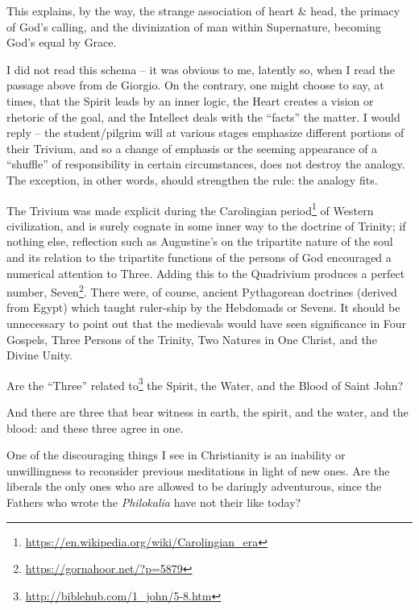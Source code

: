 This explains, by the way, the strange association of heart \& head, the primacy of God's calling, and the divinization of man within Supernature, becoming God's equal by Grace.

I did not read this schema -- it was obvious to me, latently so, when I read the passage above from de Giorgio. On the contrary, one might choose to say, at times, that the Spirit leads by an inner logic, the Heart creates a vision or rhetoric of the goal, and the Intellect deals with the ``facts'' the matter. I would reply -- the student/pilgrim will at various stages emphasize different portions of their Trivium, and so a change of emphasis or the seeming appearance of a ``shuffle'' of responsibility in certain circumstances, does not destroy the analogy. The exception, in other words, should strengthen the rule: the analogy fits.

The Trivium was made explicit during the Carolingian period\footnote{\url{https://en.wikipedia.org/wiki/Carolingian\_era}} of Western civilization, and is surely cognate in some inner way to the doctrine of Trinity; if nothing else, reflection such as Augustine's on the tripartite nature of the soul and its relation to the tripartite functions of the persons of God encouraged a numerical attention to Three. Adding this to the Quadrivium produces a perfect number, Seven\footnote{\url{https://gornahoor.net/?p=5879}}. There were, of course, ancient Pythagorean doctrines (derived from Egypt) which taught ruler-ship by the Hebdomads or Sevens. It should be unnecessary to point out that the medievals would have seen significance in Four Gospels, Three Persons of the Trinity, Two Natures in One Christ, and the Divine Unity.

Are the ``Three'' related to\footnote{\url{http://biblehub.com/1\_john/5-8.htm}} the Spirit, the Water, and the Blood of Saint John?

\begin{quotex}
And there are three that bear witness in earth, the spirit, and the water, and the blood: and these three agree in one.
\end{quotex}


One of the discouraging things I see in Christianity is an inability or unwillingness to reconsider previous meditations in light of new ones. Are the liberals the only ones who are allowed to be daringly adventurous, since the Fathers who wrote the \emph{Philokalia} have not their like today?

